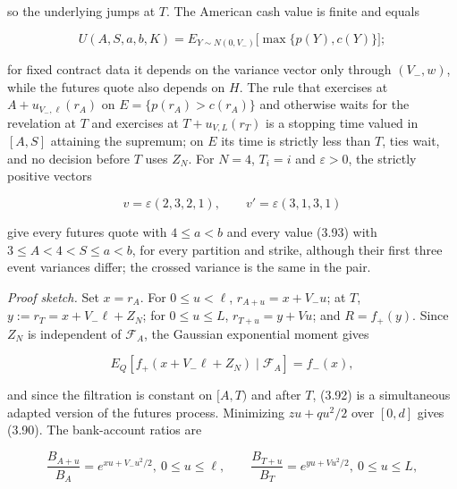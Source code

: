 \documentclass[11pt]{article}
\begin{document}
so the underlying jumps at \(T\). The American cash value is finite and equals

\begin{equation*}
U(A, S, a, b, K) = E_{Y \sim N(0, V_-)}\bigl[ \max\{p(Y), c(Y)\} \bigr]; \tag{3.93}\label{eq:3.93}
\end{equation*}

for fixed contract data it depends on the variance vector only through \((V_-, w)\), while the futures quote also depends on \(H\). The rule that exercises at \(A + u_{V_-, \ell}(r_A)\) on \(E = \{p(r_A) > c(r_A)\}\) and otherwise waits for the revelation at \(T\) and exercises at \(T + u_{V, L}(r_T)\) is a stopping time valued in \([A, S]\) attaining the supremum; on \(E\) its time is strictly less than \(T\), ties wait, and no decision before \(T\) uses \(Z_N\). For \(N = 4\), \(T_i = i\) and \(\varepsilon > 0\), the strictly positive vectors

\begin{equation*}
v = \varepsilon(2, 3, 2, 1), \qquad v' = \varepsilon(3, 1, 3, 1) \tag{3.94}\label{eq:3.94}
\end{equation*}

give every futures quote with \(4 \le a < b\) and every value (3.93) with \(3 \le A < 4 < S \le a < b\), for every partition and strike, although their first three event variances differ; the crossed variance is the same in the pair.

\emph{Proof sketch.} Set \(x = r_A\). For \(0 \le u < \ell\), \(r_{A+u} = x + V_- u\); at \(T\), \(y := r_T = x + V_- \ell + Z_N\); for \(0 \le u \le L\), \(r_{T+u} = y + Vu\); and \(R = f_+(y)\). Since \(Z_N\) is independent of \(\mathcal F_A\), the Gaussian exponential moment gives

\begin{equation*}
E_Q[f_+(x + V_- \ell + Z_N) \mid \mathcal F_A] = f_-(x), \tag{3.95}\label{eq:3.95}
\end{equation*}

and since the filtration is constant on \([A, T)\) and after \(T\), (3.92) is a simultaneous adapted version of the futures process. Minimizing \(zu + qu^2/2\) over \([0, d]\) gives (3.90). The bank-account ratios are

\begin{equation*}
\frac{B_{A+u}}{B_A} = e^{xu + V_- u^2 / 2}, \ 0 \le u \le \ell, \qquad \frac{B_{T+u}}{B_T} = e^{yu + Vu^2/2}, \ 0 \le u \le L, \tag{3.96}\label{eq:3.96}
\end{equation*}
\end{document}
